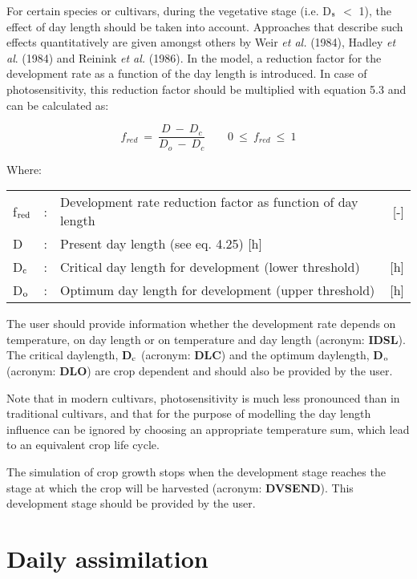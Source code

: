 For certain species or cultivars, during the vegetative stage (i.e. D$_{{\rm s}}$ $<$ 1), the effect of
day len\-gth should be taken into account. Approaches that describe such effects quantita\-tively are given amongst others by  Weir {\it et al.\/} (1984), Hadley {\it et al\/}. (1984) and Reinink {\it et al.\/} (1986). In the model, a reduction factor for the development rate as a function of the day length is intro\-duced. In case of photosensitivity, this reduction factor should be multiplied with equation 5.3 and can be calculated as:

\begin{equation}
f _{red} ~=~{\frac{D ~-~D _{c} }{D _{o} ~-~ D _{c} }} ~~~~~~~~~0~\le ~f _{red} ~\le ~1
\end{equation}

Where:\\
\begin{tabularx}{\textwidth}{llXr}
f$_{{\rm red}}$ &:& Development rate reduction factor as function of day length   &     [-]\\
D &:& Present day length (see eq. 4.25)        [h]\\
D$_{{\rm c}}$ &:& Critical day length for development (lower threshold)    &    [h]\\
D$_{{\rm o}}$ &:& Optimum day length for development (upper threshold)    &    [h]\\
\end{tabularx}

The user should provide information whether the development rate depends on tempera\-ture, on day length or on temperature and day length (acronym: {\bf IDSL}). The critical
daylength, {\bf D$_{{\rm c}}$} (acronym: {\bf DLC}) and the optimum daylength, {\bf D$_{{\rm o}}$} (acronym: {\bf DLO}) are crop depen\-dent and should also be provided by the user. 

Note that in modern cultivars, photosen\-sitivity is much less pronounced than in traditional
cultivars, and that for the purpose of modelling the day length influence can be ignored
by choosing an appropriate temperature sum, which lead to  an equivalent crop life cycle.

The simulation of crop growth stops when the development stage reaches the stage at
which the crop will be harvested (acronym: {\bf DVSEND}). This development stage should be
provided by the user. 

\section{Daily assimilation  } 

